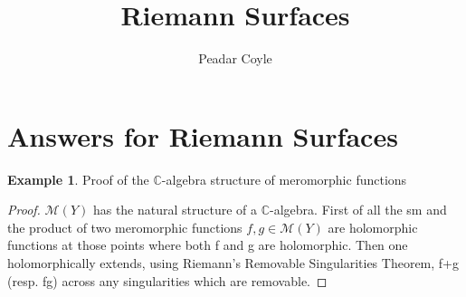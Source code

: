 \documentclass[12pt, oneside, a4paper]{article}
\title{\bf Riemann Surfaces}
\author{Peadar Coyle}
\theoremstyle{definition}
\newtheorem{ex}[thm]{Example}
\def\Cbb{\ensuremath{\mathbb{C}}}
\begin{document}
\maketitle

\newpage

\tableofcontents

\newpage
\section{Answers for Riemann Surfaces}
\begin{ex}
Proof of the \Cbb-algebra structure of meromorphic functions
\begin{proof}
 $\mathcal{M}(Y)$ has the natural structure of a $\Cbb$-algebra. First of all the sm and the product of two meromorphic 
functions $f,g \in \mathcal{M}(Y)$ are holomorphic functions at those points where both f and g are holomorphic. Then 
one holomorphically extends, using Riemann's Removable Singularities Theorem, f+g (resp. fg) across any
singularities which are removable.
\end{proof}
\end{ex}
\end{document}
